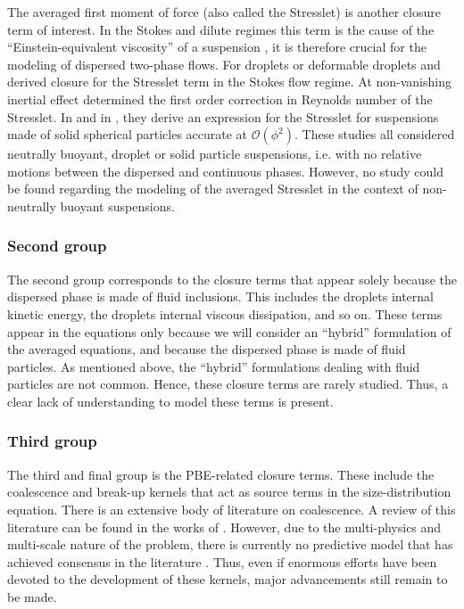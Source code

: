 The averaged first moment of force (also called the Stresslet) is another closure term of interest.
In the Stokes and dilute regimes this term is the cause of the ``Einstein-equivalent viscosity''  of a suspension \citep{guazzelli2011}, it is therefore crucial for the modeling of dispersed two-phase flows. 
For droplets or deformable droplets \citet{rallison1978note} and \citet{nadim1996concise} derived closure for the Stresslet term in the Stokes flow regime.  
At non-vanishing inertial effect \citet{raja2010inertial} determined the first order correction in Reynolds number of the Stresslet. 
In \citet{batchelor1972hydrodynamic} and in \citet{hinch1977averaged}, they derive an expression for the Stresslet for suspensions made of solid spherical particles accurate at $\mathcal{O}(\phi^2)$.
These studies all considered neutrally buoyant, droplet or solid particle suspensions, i.e. with no relative motions between the dispersed and continuous phases. 
However, no study could be found regarding the modeling of the averaged Stresslet in the context of non-neutrally buoyant suspensions. %

\subsubsection{Second group}

The second group corresponds to the closure terms that appear solely because the dispersed phase is made of fluid inclusions. 
This includes the droplets internal kinetic energy, the droplets internal viscous dissipation, and so on. 
These terms appear in the equations only because we will consider an ``hybrid'' formulation of the averaged equations, and because the dispersed phase is made of fluid particles. 
As mentioned above, the ``hybrid'' formulations dealing with fluid particles are not common. 
Hence, these closure terms are rarely studied. 
Thus, a clear lack of understanding to model these terms is present.  

\subsubsection{Third group}

The third and final group is the PBE-related closure terms. 
These include the coalescence and break-up kernels that act as source terms in the size-distribution equation. 
There is an extensive body of literature on coalescence. 
A review of this literature can be found in the works of \citet{chesters1991modelling}. 
However, due to the multi-physics and multi-scale nature of the problem, there is currently no predictive model that has achieved consensus in the literature \citep{liao2010literature}. 
Thus, even if enormous efforts have been devoted to the development of these kernels, major advancements still remain to be made. 



